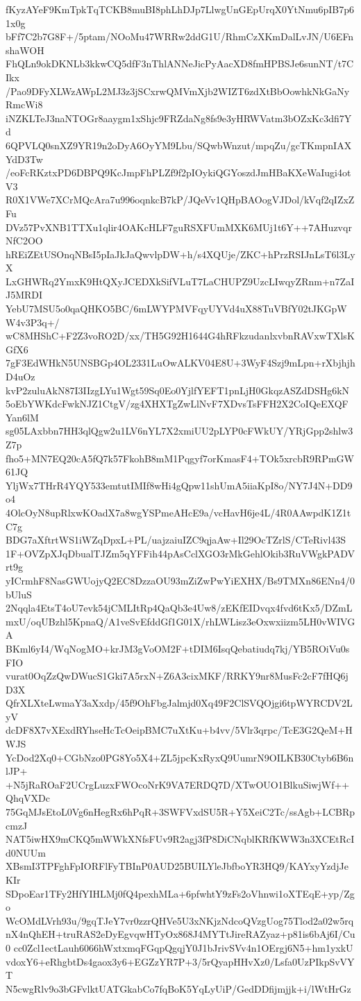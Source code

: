 fKyzAYeF9KmTpkTqTCKB8muBI8phLhDJp7LlwgUnGEpUrqX0YtNmu6pIB7p61x0g
bFf7C2b7G8F+/5ptam/NOoMu47WRRw2ddG1U/RhmCzXKmDalLvJN/U6EFnshaWOH
FhQLn9okDKNLb3kkwCQ5dfF3nThlANNeJicPyAacXD8fmHPBSJe6sunNT/t7CIkx
/Pao9DFyXLWzAWpL2MJ3z3jSCxrwQMVmXjb2WIZT6zdXtBbOowhkNkGaNyRmcWi8
iNZKLTeJ3naNTOGr8aaygm1xShjc9FRZdaNg8fs9e3yHRWVatm3bOZxKc3dfi7Yd
6QPVLQ0snXZ9YR19n2oDyA6OyYM9Lbu/SQwbWnzut/mpqZu/gcTKmpnIAXYdD3Tw
/eoFcRKztxPD6DBPQ9KcJmpFhPLZf9f2pIOykiQGYoszdJmHBaKXeWaIugi4otV3
R0X1VWe7XCrMQcAra7u996oqnkcB7kP/JQeVv1QHpBAOogVJDol/kVqf2qIZxZFu
DVz57PvXNB1TTXu1qlir4OAKcHLF7guRSXFUmMXK6MUj1t6Y++7AHuzvqrNfC2OO
hREiZEtUSOnqNBsI5pIaJkJaQwvlpDW+h/s4XQUje/ZKC+hPrzRSIJnLsT6l3LyX
LxGHWRq2YmxK9HtQXyJCEDXkSifVLuT7LaCHUPZ9UzcLIwqyZRnm+n7ZaIJ5MRDI
YebU7MSU5o0qaQHKO5BC/6mLWYPMVFqyUYVd4uX88TuVBfY02tJKGpWW4v3P3q+/
wC8MHShC+F2Z3voRO2D/xx/TH5G92H1644G4hRFkzudanlxvbnRAVxwTXlsKGfX6
7gF3EdWHkN5UNSBGp4OL2331LuOwALKV04E8U+3WyF4Szj9mLpn+rXbjhjhD4uOz
kvP2zuluAkN87I3IIzgLYu1Wgt59Sq0Eo0YjlfYEFT1pnLjH0GkqzASZdDSHg6kN
5oEbYWKdcFwkNJZ1CtgV/zg4XHXTgZwLlNvF7XDvsTsFFH2X2CoIQeEXQFYan6lM
sg05LAxbbn7HH3qlQgw2u1LV6nYL7X2xmiUU2pLYP0cFWkUY/YRjGpp2shlw3Z7p
fho5+MN7EQ20cA5fQ7k57FkohB8mM1Pqgyf7orKmasF4+TOk5xrcbR9RPmGW61JQ
YljWx7THrR4YQY533emtutIMIf8wHi4gQpw11shUmA5iiaKpI8o/NY7J4N+DD9o4
4OlcOyN8upRlxwKOadX7a8wgYSPmeAHcE9a/vcHavH6je4L/4R0AAwpdK1Z1tC7g
BDG7aXftrtWS1iWZqDpxL+PL/uajzaiuIZC9qjaAw+Il29OcTZrlS/CTeRivl43S
1F+OVZpXJqDbualTJZm5qYFFih44pAsCclXGO3rMkGehlOkib3RuVWgkPADVrt9g
yICrmhF8NasGWUojyQ2EC8DzzaOU93mZiZwPwYiEXHX/Bs9TMXn86ENn4/0bUluS
2Nqqla4EtsT4oU7evk54jCMLItRp4QaQb3e4Uw8/zEKfEIDvqx4fvd6tKx5/DZmL
mxU/oqUBzhl5KpnaQ/A1veSvEfddGf1G01X/rhLWLisz3eOxwxiizm5LH0vWIVGA
BKml6yI4/WqNogMO+krJM3gVoOM2F+tDIM6IsqQebatiudq7kj/YB5ROiVu0sFIO
vurat0OqZzQwDWucS1Gki7A5rxN+Z6A3cixMKF/RRKY9nr8MusFc2cF7fHQ6jD3X
QfrXLXteLwmaY3aXxdp/45f9OhFbgJalmjd0Xq49F2ClSVQOjgi6tpWYRCDV2LyV
dcDF8X7vXExdRYhseHcTcOeipBMC7uXtKu+b4vv/5Vlr3qrpc/TcE3G2QeM+HWJS
YcDod2Xq0+CGbNzo0PG8Yo5X4+ZL5jpcKxRyxQ9UumrN9OILKB30Ctyb6B6nlJP+
+N5jRaROaF2UCrgLuzxFWOcoNrK9VA7ERDQ7D/XTwOUO1BlkuSiwjWf++QhqVXDc
75GqMJsEtoL0Vg6nHegRx6hPqR+3SWFVxdSU5R+Y5XeiC2Tc/ssAgb+LCBRpcmzJ
NAT5iwHX9mCKQ5mWWkXNfsFUv9R2agj3fP8DiCNqblKRfKWW3n3XCEtRcId0NUUm
XBsmI3TPFghFpIORFlFyTBInP0AUD25BUILYleJbfboYR3HQ9/KAYxyYzdjJeKIr
SDpoEar1TFy2HfYIHLMj0fQ4pexhMLa+6pfwhtY9zFs2oVhnwi1oXTEqE+yp/Zgo
WcOMdLVrh93u/9gqTJeY7vr0zzrQHVe5U3xNKjzNdcoQVzgUog75Tlod2a02w5rq
nX4nQhEH+truRAS2eDyEgvqwHTyOx868J4MYTtJireRAZyaz+p81is6bAj6I/Cu0
cc0Zcl1ectLauh6066hWxtxmqFGqpQgqjY0J1bJrivSVv4n1OErgj6N5+hm1yxkU
vdoxY6+eRhgbtDs4gaox3y6+EGZzYR7P+3/5rQyapHHvXz0/Lsfa0UzPIkpSvVYT
N5cwgRlv9o3bGFvlktUATGkabCo7fqBoK5YqLyUiP/GedDDfijmjjk+i/lWtHrGz
